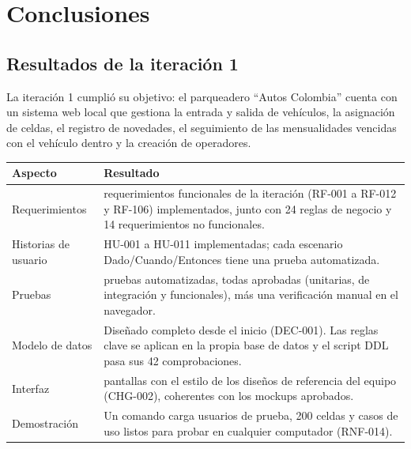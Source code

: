 \chapter{Conclusiones}\label{cap:conclusiones}

\section{Resultados de la iteración 1}
La iteración 1 cumplió su objetivo: el parqueadero ``Autos Colombia'' cuenta con un sistema web local que gestiona la entrada y salida de vehículos, la asignación de celdas, el registro de novedades, el seguimiento de las mensualidades vencidas con el vehículo dentro y la creación de operadores.

\begin{longtable}{>{\raggedright\arraybackslash}p{4.6cm}>{\raggedright\arraybackslash}p{9.8cm}}
\toprule
\textbf{Aspecto} & \textbf{Resultado}\\
\midrule\endhead
Requerimientos & 13 requerimientos funcionales de la iteración (RF-001 a RF-012 y RF-106) implementados, junto con 24 reglas de negocio y 14 requerimientos no funcionales.\\
Historias de usuario & HU-001 a HU-011 implementadas; cada escenario Dado/Cuando/Entonces tiene una prueba automatizada.\\
Pruebas & 100 pruebas automatizadas, todas aprobadas (unitarias, de integración y funcionales), más una verificación manual en el navegador.\\
Modelo de datos & Diseñado completo desde el inicio (DEC-001). Las reglas clave se aplican en la propia base de datos y el script DDL pasa sus 42 comprobaciones.\\
Interfaz & 12 pantallas con el estilo de los diseños de referencia del equipo (CHG-002), coherentes con los mockups aprobados.\\
Demostración & Un comando carga usuarios de prueba, 200 celdas y casos de uso listos para probar en cualquier computador (RNF-014).\\
\bottomrule
\end{longtable}

